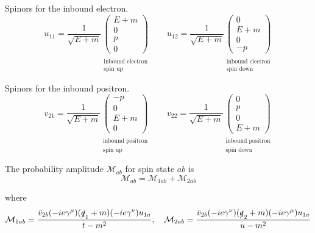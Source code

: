 Spinors for the inbound electron.
\begin{equation*}
u_{11}=\frac{1}{\sqrt{E+m}}
\underset{\substack{\\ \text{inbound electron}\\ \text{spin up}}}
{\begin{pmatrix}E+m\\0\\p\\0\end{pmatrix}}
\qquad
u_{12}=\frac{1}{\sqrt{E+m}}
\underset{\substack{\\ \text{inbound electron}\\ \text{spin down}}}
{\begin{pmatrix}0\\E+m\\0\\-p\end{pmatrix}}
\end{equation*}

Spinors for the inbound positron.
\begin{equation*}
v_{21}=\frac{1}{\sqrt{E+m}}
\underset{\substack{\\ \text{inbound positron}\\ \text{spin up}}}
{\begin{pmatrix}-p\\0\\E+m\\0\end{pmatrix}}
\qquad
v_{22}=\frac{1}{\sqrt{E+m}}
\underset{\substack{\\ \text{inbound positron}\\ \text{spin down}}}
{\begin{pmatrix}0\\p\\0\\E+m\end{pmatrix}}
\end{equation*}

The probability amplitude $\mathcal M_{ab}$ for spin state $ab$ is
\begin{equation*}
\mathcal M_{ab}=\mathcal M_{1ab}+\mathcal M_{2ab}
\end{equation*}

where
\begin{equation*}
\mathcal M_{1ab}=\frac{\bar{v}_{2b}(-ie\gamma^\mu)(\slashed q_1+m)(-ie\gamma^\nu)u_{1a}}{t-m^2},
\quad
\mathcal M_{2ab}=\frac{\bar{v}_{2b}(-ie\gamma^\nu)(\slashed q_2+m)(-ie\gamma^\mu)u_{1a}}{u-m^2}
\end{equation*}

